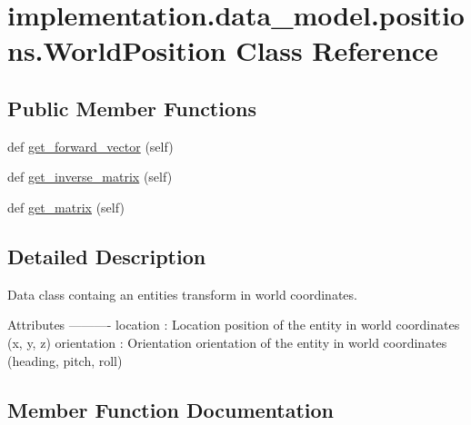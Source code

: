 \hypertarget{classimplementation_1_1data__model_1_1positions_1_1_world_position}{}\section{implementation.\+data\+\_\+model.\+positions.\+World\+Position Class Reference}
\label{classimplementation_1_1data__model_1_1positions_1_1_world_position}
\subsection*{Public Member Functions}
\begin{DoxyCompactItemize}
\item 
def \hyperlink{classimplementation_1_1data__model_1_1positions_1_1_world_position_a4370a875ed91b01c5ea46999cf35520d}{get\+\_\+forward\+\_\+vector} (self)
\item 
def \hyperlink{classimplementation_1_1data__model_1_1positions_1_1_world_position_a10c9e56720a2ed53734bcc30aeb80f0f}{get\+\_\+inverse\+\_\+matrix} (self)
\item 
def \hyperlink{classimplementation_1_1data__model_1_1positions_1_1_world_position_a2f9f55dbf68b7e3c839d630c815b8a34}{get\+\_\+matrix} (self)
\end{DoxyCompactItemize}


\subsection{Detailed Description}
\begin{DoxyVerb}Data class containg an entities transform in world coordinates.

Attributes
----------
location : Location
    position of the entity in world coordinates (x, y, z)
orientation : Orientation
    orientation of the entity in world coordinates (heading, pitch, roll)
\end{DoxyVerb}
 

\subsection{Member Function Documentation}
\mbox{\label{classimplementation_1_1data__model_1_1positions_1_1_world_position_a4370a875ed91b01c5ea46999cf35520d}} 
